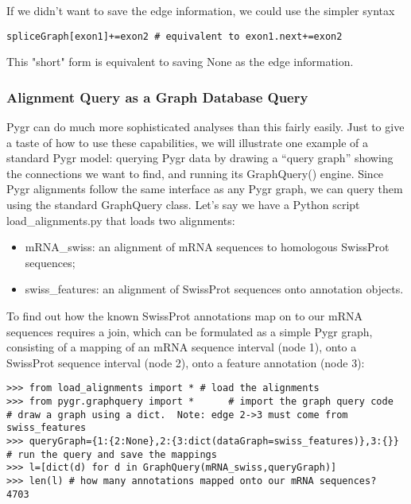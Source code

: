 \documentclass{howto}
\begin{document}
If we didn't want to save the edge information, we could use the simpler syntax

\begin{verbatim}
spliceGraph[exon1]+=exon2 # equivalent to exon1.next+=exon2
\end{verbatim}

This "short" form is equivalent to saving None as the edge information.


\subsubsection{Alignment Query as a Graph Database Query}

Pygr can do much more sophisticated analyses than this fairly easily.  
Just to give a taste of how to use these capabilities, we will illustrate
one example of a standard Pygr model: querying Pygr data by drawing a ``query
graph'' showing the connections we want to find, and running its GraphQuery()
engine.  Since Pygr alignments follow the same interface as any Pygr graph, we can query them using the standard GraphQuery class.  Let's say we have a Python script load_alignments.py that loads two alignments:

\begin{itemize}

\item
mRNA_swiss: an alignment of mRNA sequences to homologous SwissProt sequences;

\item
swiss_features: an alignment of SwissProt sequences onto annotation objects. 

\end{itemize}
To find out how the known SwissProt annotations map on to our mRNA sequences requires a join, which can be formulated as a simple Pygr graph, consisting of a mapping of an mRNA sequence interval (node 1), onto a SwissProt sequence interval (node 2), onto a feature annotation (node 3):

\begin{verbatim}
>>> from load_alignments import * # load the alignments
>>> from pygr.graphquery import *      # import the graph query code
# draw a graph using a dict.  Note: edge 2->3 must come from swiss_features
>>> queryGraph={1:{2:None},2:{3:dict(dataGraph=swiss_features)},3:{}} 
# run the query and save the mappings
>>> l=[dict(d) for d in GraphQuery(mRNA_swiss,queryGraph)] 
>>> len(l) # how many annotations mapped onto our mRNA sequences?
4703
\end{verbatim}
\end{document}
